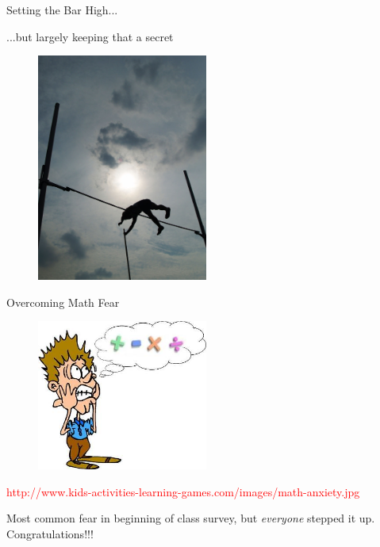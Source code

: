 \documentclass{beamer}
\begin{document}
\begin{frame}{Setting the Bar High...}

...but largely keeping that a secret

\begin{figure}[t]
    \includegraphics[width=0.5\textwidth]{PoleVault.jpg}
\end{figure}

\end{frame}

\begin{frame}{Overcoming Math Fear}

\begin{figure}[t]
    \includegraphics[width=0.5\textwidth]{math-anxiety.jpg}
\end{figure}

\tiny \textcolor{red}{http://www.kids-activities-learning-games.com/images/math-anxiety.jpg}

\small
Most common fear in beginning of class survey, but {\em everyone} stepped it up.  Congratulations!!!

\end{frame}
\end{document}
